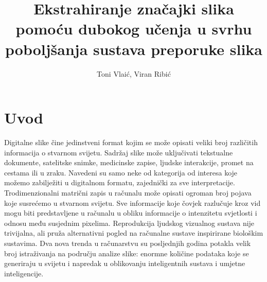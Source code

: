 \documentclass[times, utf8, proizvoljni, numeric]{fer}
\begin{document}
\title{Ekstrahiranje značajki slika pomoću dubokog učenja u svrhu poboljšanja sustava preporuke slika}
\author{Toni Vlaić, Viran Ribić}

\maketitle

\thispagestyle{empty}

\tableofcontents
\thispagestyle{empty}
\listoftables
\thispagestyle{empty}
\listoffigures
\thispagestyle{empty}


\chapter{Uvod}


Digitalne slike čine jedinstveni format kojim se može opisati veliki broj različitih informacija o stvarnom svijetu. Sadržaj slike može uključivati tekstualne dokumente, satelitske snimke, medicinske zapise, ljudske interakcije, promet na cestama ili u zraku. Navedeni su samo neke od kategorija od interesa koje možemo zabilježiti u digitalnom formatu, zajednički za sve interpretacije. Trodimenzionalni matrični zapis u računalu može opisati ogroman broj pojava koje susrećemo u stvarnom svijetu. Sve informacije koje čovjek razlučuje kroz vid mogu biti predstavljene u računalu u obliku informacije o intenzitetu svjetlosti i odnosu među susjednim pixelima. Reprodukcija ljudskog vizualnog sustava nije trivijalna, ali pruža alternativni pogled na računalne sustave inspirirane biološkim sustavima. Dva nova trenda u računarstvu su posljednjih godina potakla velik broj istraživanja na području analize slike: enormne količine podataka koje se generiraju u svijetu i napredak u oblikovanju inteligentnih sustava i umjetne inteligencije. 
\end{document}

